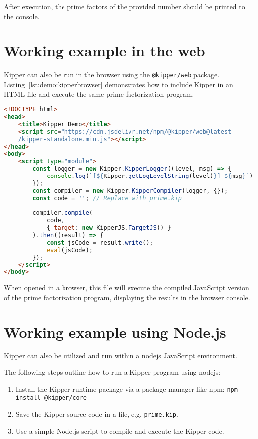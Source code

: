 After execution, the prime factors of the provided number should be printed to the console.

\section{Working example in the web}

Kipper can also be run in the browser using the \texttt{@kipper/web} package. Listing~\ref{lst:demo:kipperbrowser} demonstrates how to include Kipper in an HTML file and execute the same prime factorization program.

\begin{lstlisting}[language=HTML,caption=Running Kipper in the browser, label=lst:demo:kipperbrowser]
<!DOCTYPE html>
<head>
	<title>Kipper Demo</title>
	<script src="https://cdn.jsdelivr.net/npm/@kipper/web@latest
	/kipper-standalone.min.js"></script>
</head>
<body>
	<script type="module">
		const logger = new Kipper.KipperLogger((level, msg) => {
			console.log(`[${Kipper.getLogLevelString(level)}] ${msg}`);
		});
		const compiler = new Kipper.KipperCompiler(logger, {});
		const code = ''; // Replace with prime.kip
		
		compiler.compile(
			code, 
			{ target: new KipperJS.TargetJS() }
		).then((result) => {
			const jsCode = result.write();
			eval(jsCode);
		});
	</script>
</body>
\end{lstlisting}

When opened in a browser, this file will execute the compiled JavaScript version of the prime factorization program, displaying the results in the browser console.

\section{Working example using Node.js}

Kipper can also be utilized and run within a \Gls{nodejs} JavaScript environment.

 The following steps outline how to run a Kipper program using \Gls{nodejs}:

\begin{enumerate}
	\item Install the Kipper runtime package via a package manager like npm: \lstinline|npm install @kipper/core|
	\item Save the Kipper source code in a file, e.g. \texttt{prime.kip}.
	\item Use a simple Node.js script to compile and execute the Kipper code.
\end{enumerate}


